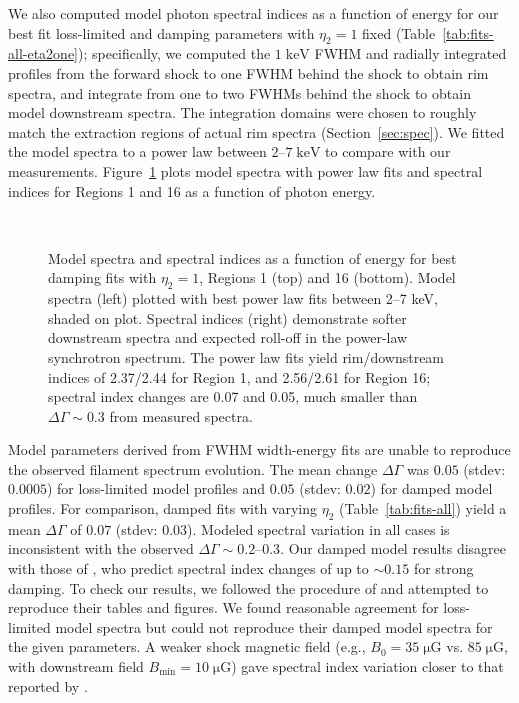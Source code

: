 \documentclass[manuscript]{aastex}  %
\newcommand*{\mt}{\mathrm}
\newcommand*{\unit}[1]{\;\mt{#1}}  %
\newcommand*{\muG}{\unit{\mu G}}
\begin{document}
We also computed model photon spectral indices as a function of energy for our
best fit loss-limited and damping parameters with $\eta_2 = 1$ fixed
(Table~\ref{tab:fits-all-eta2one}); specifically, we computed the $1
\unit{keV}$ FWHM and radially integrated profiles from the forward shock to one
FWHM behind the shock to obtain rim spectra, and integrate from one to two
FWHMs behind the shock to obtain model downstream spectra.  The integration
domains were chosen to roughly match the extraction regions of actual rim
spectra (Section~\ref{sec:spec}).  We fitted the model spectra to a power law
between $2$--$7 \unit{keV}$ to compare with our measurements.
Figure~\ref{fig:specvar} plots model spectra with power law fits and spectral
indices for Regions 1 and 16 as a function of photon energy.

\begin{figure}[h]
    \centering
     \\
    \caption{Model spectra and spectral indices as a function of energy for
    best damping fits with $\eta_2 = 1$, Regions 1 (top) and 16 (bottom).
    Model spectra (left) plotted with best power law fits between 2--7 keV,
    shaded on plot.  Spectral indices (right) demonstrate softer downstream
    spectra and expected roll-off in the power-law synchrotron spectrum.
    The power law fits yield rim/downstream indices of 2.37/2.44 for Region 1,
    and 2.56/2.61 for Region 16; spectral index changes are 0.07 and 0.05, much
    smaller than $\Delta\Gamma \sim 0.3$ from measured spectra.
    \label{fig:specvar}}
\end{figure}

Model parameters derived from FWHM width-energy fits are unable to reproduce
the observed filament spectrum evolution.  The mean change $\Delta\Gamma$ was
$0.05$ (stdev: $0.0005$) for loss-limited model profiles and $0.05$ (stdev:
$0.02$) for damped model profiles.  For comparison, damped fits with varying
$\eta_2$ (Table~\ref{tab:fits-all}) yield a mean $\Delta\Gamma$ of $0.07$
(stdev: $0.03$).  Modeled spectral variation in all cases is inconsistent with
the observed $\Delta\Gamma \sim 0.2$--$0.3$.
Our damped model results disagree with those of \citet[][Fig.~4]{rettig2012},
who predict spectral index changes of up to $\sim 0.15$ for strong damping.  To
check our results, we followed the procedure of \citet{rettig2012} and
attempted to reproduce their tables and figures.  We found reasonable agreement
for loss-limited model spectra but could not reproduce their damped model
spectra for the given parameters.  A weaker shock magnetic field (e.g., $B_0 =
35 \muG$ vs. $85 \muG$, with downstream field $B_{\mt{min}} = 10 \muG$) gave
spectral index variation closer to that reported by \citet{rettig2012}.
\end{document}
